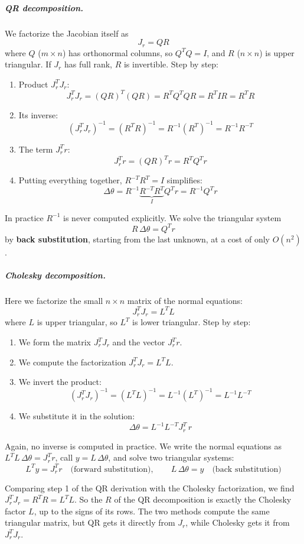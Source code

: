 \subparagraph{QR decomposition.} We factorize the Jacobian itself as
\[
J_r = QR
\]
where $Q$ ($m\times n$) has orthonormal columns, so $Q^T Q = I$, and $R$ ($n\times n$) is upper triangular. If $J_r$ has full rank, $R$ is invertible. Step by step:
\begin{enumerate}
    \item Product $J_r^T J_r$:
    \[
    J_r^T J_r = (QR)^T (QR) = R^T Q^T Q R = R^T I R = R^T R
    \]
    \item Its inverse:
    \[
    (J_r^T J_r)^{-1} = (R^T R)^{-1} = R^{-1} (R^T)^{-1} = R^{-1} R^{-T}
    \]
    \item The term $J_r^T r$:
    \[
    J_r^T r = (QR)^T r = R^T Q^T r
    \]
    \item Putting everything together, $R^{-T} R^T = I$ simplifies:
    \[
    \Delta\theta = R^{-1} \underbrace{R^{-T} R^T}_{I} Q^T r = R^{-1} Q^T r
    \]
\end{enumerate}
In practice $R^{-1}$ is never computed explicitly. We solve the triangular system
\[
R\, \Delta\theta = Q^T r
\]
by \textbf{back substitution}, starting from the last unknown, at a cost of only $O(n^2)$.

\subparagraph{Cholesky decomposition.} Here we factorize the small $n\times n$ matrix of the normal equations:
\[
J_r^T J_r = L^T L
\]
where $L$ is upper triangular, so $L^T$ is lower triangular. Step by step:
\begin{enumerate}
    \item We form the matrix $J_r^T J_r$ and the vector $J_r^T r$.
    \item We compute the factorization $J_r^T J_r = L^T L$.
    \item We invert the product:
    \[
    (J_r^T J_r)^{-1} = (L^T L)^{-1} = L^{-1} (L^T)^{-1} = L^{-1} L^{-T}
    \]
    \item We substitute it in the solution:
    \[
    \Delta\theta = L^{-1} L^{-T} J_r^T\, r
    \]
\end{enumerate}
Again, no inverse is computed in practice. We write the normal equations as $L^T L\,\Delta\theta = J_r^T r$, call $y = L\,\Delta\theta$, and solve two triangular systems:
\[
L^T y = J_r^T r \quad \text{(forward substitution)}, \qquad L\, \Delta\theta = y \quad \text{(back substitution)}
\]

Comparing step 1 of the QR derivation with the Cholesky factorization, we find $J_r^T J_r = R^T R = L^T L$. So the $R$ of the QR decomposition is exactly the Cholesky factor $L$, up to the signs of its rows. The two methods compute the same triangular matrix, but QR gets it directly from $J_r$, while Cholesky gets it from $J_r^T J_r$.

